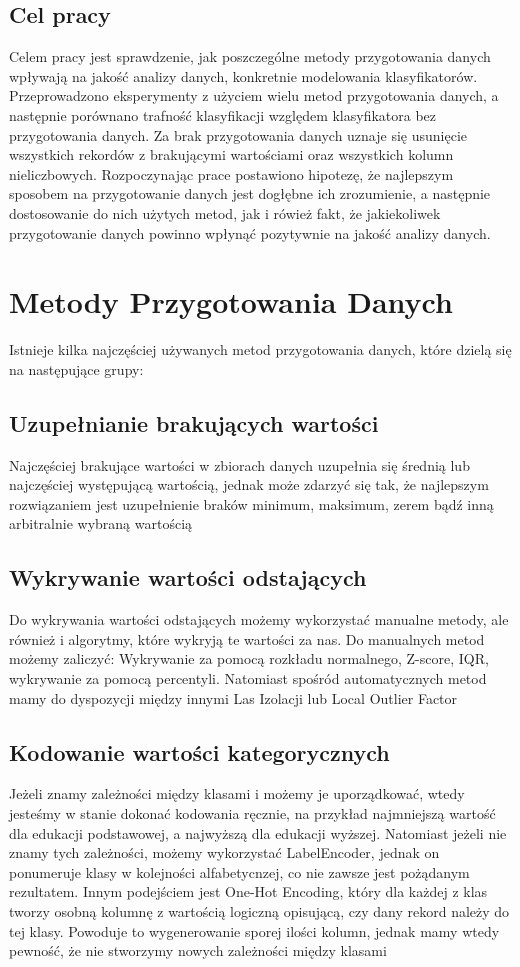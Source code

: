 \documentclass{book}
\begin{document}
\section{Cel pracy}
Celem pracy jest sprawdzenie, jak poszczególne metody przygotowania danych
wpływają na jakość analizy danych, konkretnie modelowania klasyfikatorów. Przeprowadzono 
eksperymenty z użyciem wielu metod przygotowania danych, a następnie porównano trafność klasyfikacji 
względem klasyfikatora bez przygotowania danych. Za brak przygotowania danych uznaje się usunięcie 
wszystkich rekordów z brakującymi wartościami oraz wszystkich kolumn nieliczbowych.
Rozpoczynając prace postawiono hipotezę, że najlepszym sposobem na przygotowanie danych jest dogłębne 
ich zrozumienie, a następnie dostosowanie do nich użytych metod, jak i rówież fakt, że jakiekoliwek przygotowanie 
danych powinno wpłynąć pozytywnie na jakość analizy danych.

\chapter{Metody Przygotowania Danych}
Istnieje kilka najczęściej używanych metod przygotowania danych, 
które dzielą się na następujące grupy:

\section{Uzupełnianie brakujących wartości}
Najczęściej brakujące wartości w zbiorach danych uzupełnia się średnią 
lub najczęściej występującą wartością, jednak może zdarzyć się tak, 
że najlepszym rozwiązaniem jest uzupełnienie braków minimum, maksimum, 
zerem bądź inną arbitralnie wybraną wartością
\section{Wykrywanie wartości odstających}
Do wykrywania wartości odstających możemy wykorzystać manualne metody, 
ale również i algorytmy, które wykryją te wartości za nas. 
Do manualnych metod możemy zaliczyć: Wykrywanie za pomocą rozkładu 
normalnego, Z-score, IQR, wykrywanie za pomocą percentyli. 
Natomiast spośród automatycznych metod mamy do dyspozycji między innymi 
Las Izolacji lub Local Outlier Factor
\section{Kodowanie wartości kategorycznych}
Jeżeli znamy zależności między klasami i możemy je uporządkować, 
wtedy jesteśmy w stanie dokonać kodowania ręcznie, na przykład 
najmniejszą wartość dla edukacji podstawowej, a najwyższą dla 
edukacji wyższej. Natomiast jeżeli nie znamy tych zależności, 
możemy wykorzystać LabelEncoder, jednak on ponumeruje klasy w 
kolejności alfabetycnzej, co nie zawsze jest pożądanym rezultatem. 
Innym podejściem jest One-Hot Encoding\cite{one_hot_encoding}, który dla każdej z klas 
tworzy osobną kolumnę z wartością logiczną opisującą, czy dany 
rekord należy do tej klasy. Powoduje to wygenerowanie sporej 
ilości kolumn, jednak mamy wtedy pewność, że nie stworzymy 
nowych zależności między klasami
\end{document}
